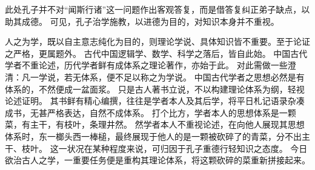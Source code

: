 \documentclass[11pt]{article}
\begin{document}
此处孔子并不对“闻斯行诸”这一问题作出客观答复，而是借答复纠正弟子缺点，以助其成德。
可见，孔子治学施教，以进德为目的，对知识本身并不重视。

\newline

人之为学，既以自主意志纯化为目的，则理论学说、具体知识皆不重要。至于论证之严格，更属题外。
古代中国逻辑学、数学、科学之落后，皆自此始。
中国古代学者不重论述，历代学者鲜有成体系之理论著作，亦始于此。
对此需做一些澄清：凡一学说，若无体系，便不足以称之为学说。
中国古代学者之思想必然是有体系的，不然便成一盆面浆。
只是古人著书立说，不以构建理论体系为纲，轻视论述证明。
其书鲜有精心编撰，往往是学者本人及其后学，将平日札记语录杂凑成书，无甚严格表达，自然不成体系。
打个比方，学者本人的思想体系是一颗菜，有主干，有枝叶，条理井然。
然学者本人不重视论述，在向他人展现其思想体系时，东一榔头西一棒槌，最终展现于他人的是一颗被砍碎了的青菜，分不出主干、枝叶。
这一状况在某种程度来说，可归因于孔子重德行轻知识之态度。
今日欲治古人之学，一重要任务便是重构其理论体系，将这颗砍碎的菜重新拼接起来。
  
\end{document}
